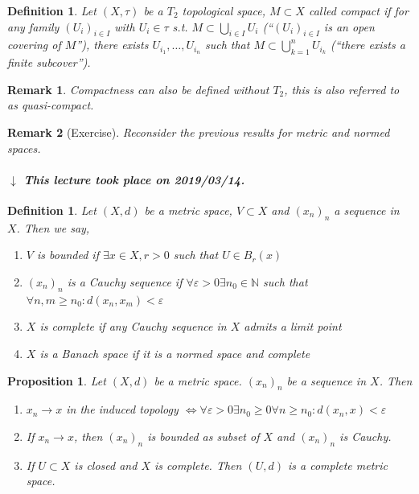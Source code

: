 \documentclass[a4paper]{article}
\newcounter{lecref}[section]
\numberwithin{lecref}{section}
\newtheorem{definition}[lecref]{Definition}
\newtheorem*{Remark}{Remark}
\newtheorem{proposition}[lecref]{Proposition}
\newcommand{\dateref}[1]{%
  \begin{mdframed}[backgroundcolor=gray!10,innerbottommargin=0pt,innertopmargin=0pt]
    \paragraph{\textit{$\downarrow$ This lecture took place on #1.}}%
  \end{mdframed}%
}
\begin{document}
\begin{definition}
	\label{definition:1.12}
	Let $(X, \tau)$ be a $T_2$ topological space, $M \subset X$ called \emph{compact} if for any family $(U_i)_{i \in I}$ with $U_i \in \tau$ s.t. $M \subset \bigcup_{i \in I} U_i$ (\enquote{$(U_i)_{i \in I}$ is an open covering of $M$}), there exists $U_{i_1}, \dots, U_{i_n}$ such that $M \subset \bigcup_{k=1}^n U_{i_k}$ (\enquote{there exists a finite subcover}).
\end{definition}

\begin{Remark}
	Compactness can also be defined without $T_2$, this is also referred to as \emph{quasi-compact}.
\end{Remark}

\begin{Remark}[Exercise]
	Reconsider the previous results for metric and normed spaces.
\end{Remark}

\dateref{2019/03/14}

\begin{definition}
	\label{definition:1.13}
	Let $(X, d)$ be a metric space, $V \subset X$ and $(x_n)_n$ a sequence in $X$. Then we say,
	\begin{enumerate}
		\item $V$ is \emph{bounded} if $\exists x \in X, r > 0$ such that $U \in B_r(x)$
		\item $(x_n)_n$ is a \emph{Cauchy sequence} if $\forall \varepsilon > 0 \exists n_0 \in \mathbb N$ such that $\forall n, m \geq n_0: d(x_n, x_m) < \varepsilon$
		\item $X$ is \emph{complete} if any Cauchy sequence in $X$ admits a limit point
		\item $X$ is a \emph{Banach space} if it is a normed space and complete
	\end{enumerate}
\end{definition}

\begin{proposition}
	\label{proposition:1.14}
	Let $(X, d)$ be a metric space. $(x_n)_n$ be a sequence in $X$. Then
	\begin{enumerate}
		\item $x_n \to x$ in the induced topology $\iff \forall \varepsilon > 0 \exists n_0 \geq 0 \forall n \geq n_0: d(x_n, x) < \varepsilon$
		\item If $x_n \to x$, then $(x_n)_n$ is bounded as subset of $X$ and $(x_n)_n$ is Cauchy.
		\item If $U \subset X$ is closed and $X$ is complete. Then $(U, d)$ is a complete metric space.
	\end{enumerate}
\end{proposition}
\end{document}
